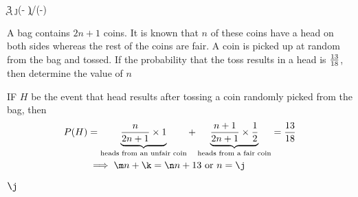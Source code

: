 


\DIVIDE{}\k
\MULTIPLY\k{3}\m
\MULTIPLY{}\n
\EXPR[0]\j{(\va - \k)/(\m-\n)}

\question[2] A bag contains $2n+1$ coins. It is known that $n$ of these coins have a head on 
both sides whereas the rest of the coins are fair. A coin is picked up at random 
from the bag and tossed. If the probability that the toss results in a head is $\frac{13}{18}$, 
then determine the value of $n$


\watchout[-30pt]

\ifprintanswers
\fi 

\begin{solution}[\halfpage]
  IF $H$ be the event that head results after tossing a coin randomly picked 
  from the bag, then 
  \begin{align}
    P(H) &= \underbrace{\dfrac{n}{2n+1}\times 1}_{\text{heads from an unfair coin}} 
            + \underbrace{\dfrac{n+1}{2n+1}\times\dfrac{1}{2}}_{\text{heads from a fair coin}}
            = \dfrac\va\vb \\
          &\implies \m n + \k = \n n + \va \text{ or } n = \j
  \end{align} 
\end{solution}

\ifprintanswers\begin{codex}$\j$\end{codex}\fi
